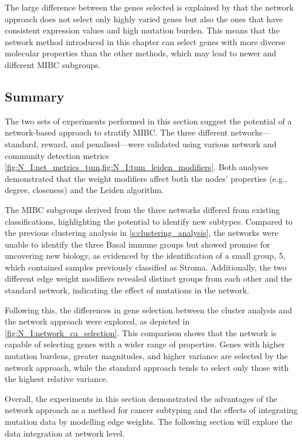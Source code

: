 The large difference between the genes selected is explained by that the network approach does not select only highly varied genes but also the ones that have consistent expression values and high mutation burden. This means that the network method introduced in this chapter can select genes with more diverse molecular properties than the other methods, which may lead to newer and different MIBC subgroups.


\subsection{Summary}

The two sets of experiments performed in this section suggest the potential of a network-based approach to stratify MIBC. The three different networks—standard, reward, and penalised—were validated using various network and community detection metrics \cref{fig:N_I:net_metrics_tum,fig:N_I:tum_leiden_modifiers}. Both analyses demonstrated that the weight modifiers affect both the nodes' properties (e.g., degree, closeness) and the Leiden algorithm.

The MIBC subgroups derived from the three networks differed from existing classifications, highlighting the potential to identify new subtypes. Compared to the previous clustering analysis in \cref{s:clustering_analysis}, the networks were unable to identify the three Basal immune groups but showed promise for uncovering new biology, as evidenced by the identification of a small group, 5, which contained samples previously classified as Stroma. Additionally, the two different edge weight modifiers revealed distinct groups from each other and the standard network, indicating the effect of mutations in the network.

Following this, the differences in gene selection between the cluster analysis and the network approach were explored, as depicted in \cref{fig:N_I:network_ca_selection}. This comparison shows that the network is capable of selecting genes with a wider range of properties. Genes with higher mutation burdens, greater magnitudes, and higher variance are selected by the network approach, while the standard approach tends to select only those with the highest relative variance.

Overall, the experiments in this section demonstrated the advantages of the network approach as a method for cancer subtyping and the effects of integrating mutation data by modelling edge weights. The following section will explore the data integration at network level.
